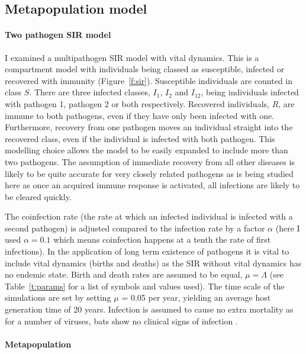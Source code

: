 \begin{table}[b!]
\label{t:params}
\end{table}




\subsection{Metapopulation model}




\paragraph{Two pathogen SIR model}

I examined a multipathogen SIR model with vital dynamics. 
This is a compartment model with individuals being classed as susceptible, infected or recovered with immunity (Figure~\ref{f:sir}).
Susceptible individuals are counted in class $S$.
There are three infected classes, $I_1$, $I_2$ and $I_{12}$, being individuals infected with pathogen 1, pathogen 2 or both respectively.
Recovered individuals, $R$, are immune to both pathogens, even if they have only been infected with one.
Furthermore, recovery from one pathogen moves an individual straight into the recovered class, even if the individual is infected with both pathogen.
This modelling choice allows the model to be easily expanded to include more than two pathogens.
The assumption of immediate recovery from all other diseases is likely to be quite accurate for very closely related pathogens as is being studied here as once an acquired immune response is activated, all infections are likely to be cleared quickly.

The coinfection rate (the rate at which an infected individual is infected with a second pathogen) is adjusted compared to the infection rate by a factor $\alpha$ (here I used $\alpha = 0.1$ which means coinfection happens at a tenth the rate of first infections).
In the application of long term existence of pathogens it is vital to include vital dynamics (births and deaths) as the SIR without vital dynamics has no endemic state.
Birth and death rates are assumed to be equal, $\mu = \Lambda$ (see Table~\ref{t:params} for a list of symbols and values used).
The time scale of the simulations are set by setting $\mu$ = 0.05 per year, yielding an average host generation time of 20 years.
Infection is assumed to cause no extra mortality as for a number of viruses, bats show no clinical signs of infection \cite{halpin2011pteropid, deThoisy2016bioecological}.


\paragraph{Metapopulation}


